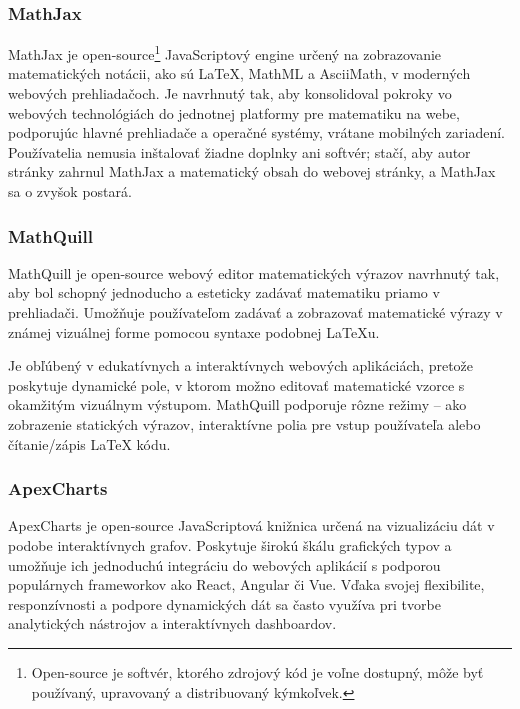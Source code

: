 \subsubsection*{MathJax}
MathJax je open-source\footnote{Open-source je softvér, ktorého zdrojový kód je voľne dostupný, môže byť používaný, upravovaný a distribuovaný kýmkoľvek.} JavaScriptový engine určený na zobrazovanie matematických notácii, ako sú LaTeX, MathML a AsciiMath, v moderných webových prehliadačoch.
Je navrhnutý tak, aby konsolidoval pokroky vo webových technológiách do jednotnej platformy pre matematiku na webe, podporujúc hlavné prehliadače a operačné systémy, vrátane mobilných zariadení.
Používatelia nemusia inštalovať žiadne doplnky ani softvér; stačí, aby autor stránky zahrnul MathJax a matematický obsah do webovej stránky, a MathJax sa o zvyšok postará.\cite{MathJax}


  \subsubsection*{MathQuill}
  MathQuill je open-source webový editor matematických výrazov navrhnutý tak, aby bol schopný jednoducho a esteticky zadávať matematiku priamo v prehliadači. 
  Umožňuje používateľom zadávať a zobrazovať matematické výrazy v známej vizuálnej forme pomocou syntaxe podobnej LaTeXu.

Je obľúbený v edukatívnych a interaktívnych webových aplikáciách, pretože poskytuje dynamické pole, v ktorom možno editovať matematické vzorce s okamžitým vizuálnym výstupom. 
MathQuill podporuje rôzne režimy – ako zobrazenie statických výrazov, interaktívne polia pre vstup používateľa alebo čítanie/zápis LaTeX kódu.\cite{mathquill}
\subsubsection*{ApexCharts}
ApexCharts je open-source JavaScriptová knižnica určená na vizualizáciu dát v podobe interaktívnych grafov.
 Poskytuje širokú škálu grafických typov a umožňuje ich jednoduchú integráciu do webových aplikácií s podporou populárnych frameworkov ako React, Angular či Vue. 
Vďaka svojej flexibilite, responzívnosti a podpore dynamických dát sa často využíva pri tvorbe analytických nástrojov a interaktívnych dashboardov.\cite{apexcharts}

